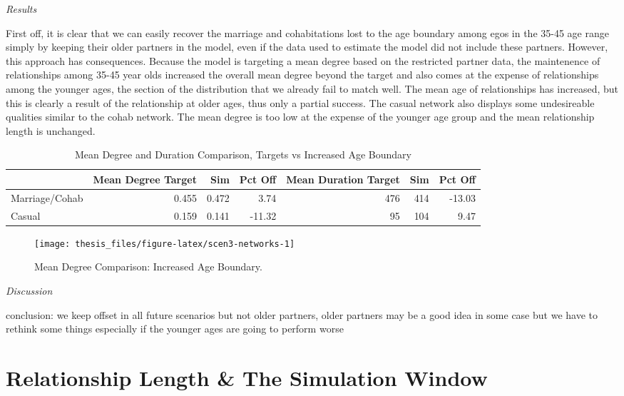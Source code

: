 \documentclass [11pt, proquest] {uwthesis}[2015/03/03]
\begin{document}
\emph{Results}

First off, it is clear that we can easily recover the marriage and
cohabitations lost to the age boundary among egos in the 35-45 age range
simply by keeping their older partners in the model, even if the data
used to estimate the model did not include these partners. However, this
approach has consequences. Because the model is targeting a mean degree
based on the restricted partner data, the maintenence of relationships
among 35-45 year olds increased the overall mean degree beyond the
target and also comes at the expense of relationships among the younger
ages, the section of the distribution that we already fail to match
well. The mean age of relationships has increased, but this is clearly a
result of the relationship at older ages, thus only a partial success.
The casual network also displays some undesireable qualities similar to
the cohab network. The mean degree is too low at the expense of the
younger age group and the mean relationship length is unchanged.
\begin{table}

\caption{\label{tab:scen3-tab}Mean Degree and Duration Comparison, Targets vs Increased Age Boundary}
\centering
\begin{tabular}[t]{lrrrrrr}
\toprule
  & Mean Degree Target & Sim & Pct Off & Mean Duration Target & Sim & Pct Off\\
\midrule
Marriage/Cohab & 0.455 & 0.472 & 3.74 & 476 & 414 & -13.03\\
Casual & 0.159 & 0.141 & -11.32 & 95 & 104 & 9.47\\
\bottomrule
\end{tabular}
\end{table}
\begin{figure}

{\centering \texttt{[image: thesis\_files/figure-latex/scen3-networks-1]} 

}

\caption{Mean Degree Comparison: Increased Age Boundary.}\label{fig:scen3-networks}
\end{figure}
\emph{Discussion}

conclusion: we keep offset in all future scenarios but not older
partners, older partners may be a good idea in some case but we have to
rethink some things especially if the younger ages are going to perform
worse

\section{Relationship Length \& The Simulation
Window}\label{relationship-length-the-simulation-window}
\end{document}
